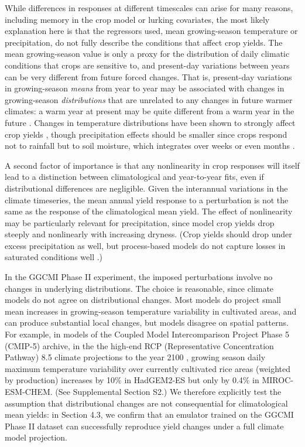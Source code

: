 \documentclass[gmdd]{copernicus} %
\begin{document}
While differences in responses at different timescales can arise for many reasons, including memory in the crop model or lurking covariates, the most likely explanation here is that the regressors used, mean growing-season temperature or precipitation, do not fully describe the conditions that affect crop yields. 
The mean growing-season value is only a proxy for the distribution of daily climatic conditions that crops are sensitive to, and present-day variations between years can be very different from future forced changes. 
That is, present-day variations in growing-season \textit{means} from year to year may be associated with changes in growing-season \textit{distributions} that are unrelated to any changes in future warmer climates: a warm year at present may be quite different from a warm year in the future \citep[e.g.][]{Ruane2016}. %
Changes in temperature distributions have been shown to strongly affect crop yields \citep[e.g.][]{Hansen2000, Gadgil2002}, though precipitation effects should be smaller since crops respond not to rainfall but to soil moisture, which integrates over weeks or even months \citep[e.g.][]{potter2005effects, Glotter14, CHALLINOR200499}. 

A second factor of importance is that any nonlinearity in crop responses will itself lead to a distinction between climatological and year-to-year fits, even if distributional differences are negligible. 
Given the interannual variations in the climate timeseries, the mean annual yield response to a perturbation is not the same as the response of the climatological mean yield. 
The effect of nonlinearity may be particularly relevant for precipitation, since model crop yields drop steeply and nonlinearly with increasing dryness. 
(Crop yields should drop under excess precipitation as well, but process-based models do not capture losses in saturated conditions well \citep{Glotter15,Li2019}.) 

In the GGCMI Phase II experiment, the imposed perturbations involve no changes in underlying distributions.
The choice is reasonable, since climate models do not agree on distributional changes.
Most models do project small mean increases in growing-season temperature variability in cultivated areas, and can produce substantial local changes, but models disagree on spatial patterns.
For example, in models of the Coupled Model Intercomparison Project Phase 5 (CMIP-5) archive, in the the high-end RCP (Representative Concentration Pathway) 8.5 climate projections to the year 2100 \citep{riahi2011rcp}, growing season daily maximum temperature variability over currently cultivated rice areas (weighted by production) increases by 10\% in HadGEM2-ES but only by 0.4\% in MIROC-ESM-CHEM. (See Supplemental Section S2.)
We therefore explicitly test the assumption that distributional changes are not consequential for climatological mean yields: in Section 4.3, we confirm that an emulator trained on the GGCMI Phase II dataset can successfully reproduce yield changes under a full climate model projection.
\end{document}

